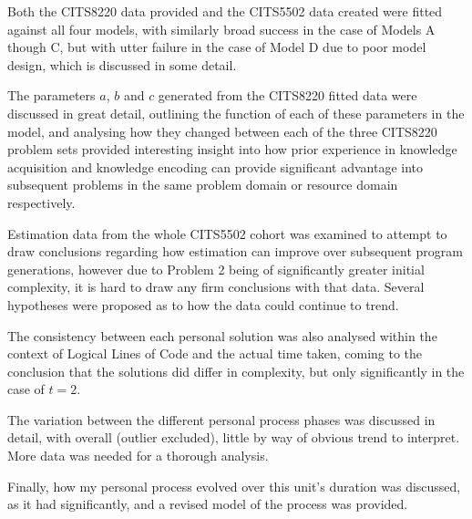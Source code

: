 \documentclass[a4paper,10pt]{article}
\begin{document}
Both the CITS8220 data provided and the CITS5502 data created were fitted against all four models, with similarly broad success in the case of Models A though C, but with utter failure in the case of Model D due to poor model design, which is discussed in some detail.

The parameters $a$, $b$ and $c$ generated from the CITS8220 fitted data were discussed in great detail, outlining the function of each of these parameters in the model, and analysing how they changed between each of the three CITS8220 problem sets provided interesting insight into how prior experience in knowledge acquisition and knowledge encoding can provide significant advantage into subsequent problems in the same problem domain or resource domain respectively.

Estimation data from the whole CITS5502 cohort was examined to attempt to draw conclusions regarding how estimation can improve over subsequent program generations, however due to Problem 2 being of significantly greater initial complexity, it is hard to draw any firm conclusions with that data. Several hypotheses were proposed as to how the data could continue to trend.

The consistency between each personal solution was also analysed within the context of Logical Lines of Code and the actual time taken, coming to the conclusion that the solutions did differ in complexity, but only significantly in the case of $t=2$.

The variation between the different personal process phases was discussed in detail, with overall (outlier excluded), little by way of obvious trend to interpret. More data was needed for a thorough analysis.

Finally, how my personal process evolved over this unit's duration was discussed, as it had significantly, and a revised model of the process was provided.






%
\end{document}
